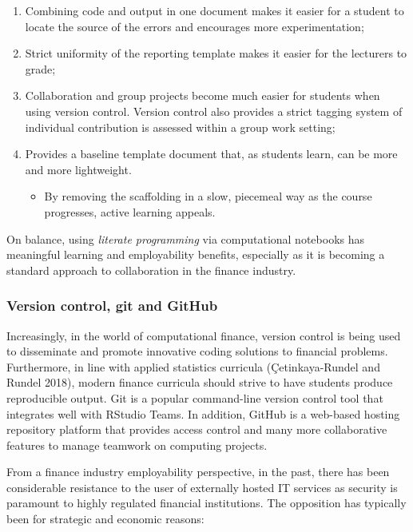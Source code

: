 \documentclass{article}
\providecommand{\tightlist}{%
  \setlength{\itemsep}{0pt}\setlength{\parskip}{0pt}}
\begin{document}
\begin{enumerate}
\def\labelenumi{\arabic{enumi}.}
\tightlist
\item
  Combining code and output in one document makes it easier for a
  student to locate the source of the errors and encourages more
  experimentation;
\item
  Strict uniformity of the reporting template makes it easier for the
  lecturers to grade;
\item
  Collaboration and group projects become much easier for students when
  using version control. Version control also provides a strict tagging
  system of individual contribution is assessed within a group work
  setting;
\item
  Provides a baseline template document that, as students learn, can be
  more and more lightweight.

  \begin{itemize}
  \tightlist
  \item
    By removing the scaffolding in a slow, piecemeal way as the course
    progresses, active learning appeals.
  \end{itemize}
\end{enumerate}

On balance, using \emph{literate programming} via computational
notebooks has meaningful learning and employability benefits, especially
as it is becoming a standard approach to collaboration in the finance
industry.

\hypertarget{version-control-git-and-github}{%
\subsubsection{Version control, git and
GitHub}\label{version-control-git-and-github}}

Increasingly, in the world of computational finance, version control is
being used to disseminate and promote innovative coding solutions to
financial problems. Furthermore, in line with applied statistics
curricula (Çetinkaya-Rundel and Rundel 2018), modern finance curricula
should strive to have students produce reproducible output. Git is a
popular command-line version control tool that integrates well with
RStudio Teams. In addition, GitHub is a web-based hosting repository
platform that provides access control and many more collaborative
features to manage teamwork on computing projects.

From a finance industry employability perspective, in the past, there
has been considerable resistance to the user of externally hosted IT
services as security is paramount to highly regulated financial
institutions. The opposition has typically been for strategic and
economic reasons:
\end{document}
